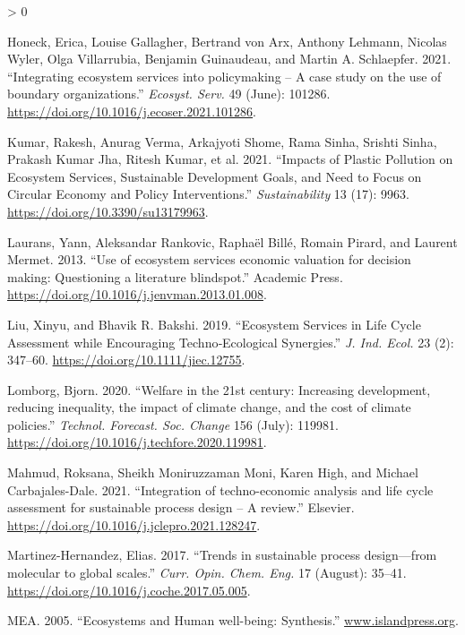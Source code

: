 \documentclass[
]{article}
\newlength{\cslhangindent}
\newenvironment{CSLReferences}[2] %
 {%
  \setlength{\parindent}{0pt}
  \ifodd #1 \everypar{\setlength{\hangindent}{\cslhangindent}}\ignorespaces\fi
  \ifnum #2 > 0
  \setlength{\parskip}{#2\baselineskip}
  \fi
 }%
 {}
\begin{document}
\begin{CSLReferences}{1}{0}
\leavevmode\hypertarget{ref-Honeck2021}{}%
Honeck, Erica, Louise Gallagher, Bertrand von Arx, Anthony Lehmann, Nicolas Wyler, Olga Villarrubia, Benjamin Guinaudeau, and Martin A. Schlaepfer. 2021. {``{Integrating ecosystem services into policymaking -- A case study on the use of boundary organizations}.''} \emph{Ecosyst. Serv.} 49 (June): 101286. \url{https://doi.org/10.1016/j.ecoser.2021.101286}.

\leavevmode\hypertarget{ref-Kumar2021}{}%
Kumar, Rakesh, Anurag Verma, Arkajyoti Shome, Rama Sinha, Srishti Sinha, Prakash Kumar Jha, Ritesh Kumar, et al. 2021. {``{Impacts of Plastic Pollution on Ecosystem Services, Sustainable Development Goals, and Need to Focus on Circular Economy and Policy Interventions}.''} \emph{Sustainability} 13 (17): 9963. \url{https://doi.org/10.3390/su13179963}.

\leavevmode\hypertarget{ref-Laurans2013}{}%
Laurans, Yann, Aleksandar Rankovic, Raphaël Billé, Romain Pirard, and Laurent Mermet. 2013. {``{Use of ecosystem services economic valuation for decision making: Questioning a literature blindspot}.''} Academic Press. \url{https://doi.org/10.1016/j.jenvman.2013.01.008}.

\leavevmode\hypertarget{ref-Liu2019g}{}%
Liu, Xinyu, and Bhavik R. Bakshi. 2019. {``{Ecosystem Services in Life Cycle Assessment while Encouraging Techno‐Ecological Synergies}.''} \emph{J. Ind. Ecol.} 23 (2): 347--60. \url{https://doi.org/10.1111/jiec.12755}.

\leavevmode\hypertarget{ref-Lomborg2020}{}%
Lomborg, Bjorn. 2020. {``{Welfare in the 21st century: Increasing development, reducing inequality, the impact of climate change, and the cost of climate policies}.''} \emph{Technol. Forecast. Soc. Change} 156 (July): 119981. \url{https://doi.org/10.1016/j.techfore.2020.119981}.

\leavevmode\hypertarget{ref-Mahmud2021}{}%
Mahmud, Roksana, Sheikh Moniruzzaman Moni, Karen High, and Michael Carbajales-Dale. 2021. {``{Integration of techno-economic analysis and life cycle assessment for sustainable process design -- A review}.''} Elsevier. \url{https://doi.org/10.1016/j.jclepro.2021.128247}.

\leavevmode\hypertarget{ref-Martinez-Hernandez2017}{}%
Martinez-Hernandez, Elias. 2017. {``{Trends in sustainable process design---from molecular to global scales}.''} \emph{Curr. Opin. Chem. Eng.} 17 (August): 35--41. \url{https://doi.org/10.1016/j.coche.2017.05.005}.

\leavevmode\hypertarget{ref-MEA2005}{}%
MEA. 2005. {``{Ecosystems and Human well-being: Synthesis}.''} \href{https://www.islandpress.org}{www.islandpress.org}.


\end{CSLReferences}
\end{document}
